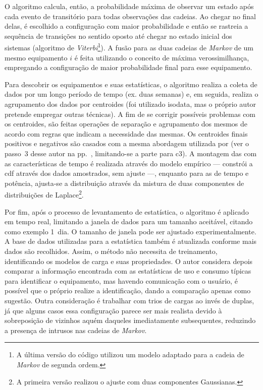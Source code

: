\begin{enumerate}[label=\textbf{1.\arabic*},wide=\parindent]
O algoritmo calcula, então, a probabilidade máxima de observar um
estado após cada evento de transitório para todas observações das
cadeias. Ao chegar no final delas, é escolhido a configuração com
maior probabilidade e então se rastreia a sequência de transições no
sentido oposto até chegar no estado inicial dos sistemas (algoritmo de
\emph{Viterbi}\footnote{A última versão do código utilizou um modelo
adaptado para a cadeia de \emph{Markov} de segunda ordem.}). A fusão
para as duas cadeias de \emph{Markov} de um mesmo equipamento $i$ é feita
utilizando o conceito de máxima verossimilhança, empregando a
configuração de maior probabilidade final para esse equipamento.

Para descobrir os equipamentos e suas estatísticas, o algoritmo realiza a
coleta de dados por um longo período de tempo (ex. duas semanas) e,
em seguida, realiza o agrupamento dos dados por centroides (foi
utilizado \acs{isodata}, mas o próprio autor pretende empregar
outras técnicas). A fim de se corrigir possíveis problemas com os centroides,
são feitas operações de separação e agrupamento dos mesmos de acordo
com regras que indicam a necessidade das mesmas. Os centroides finais
positivos e negativos são casados com a mesma abordagem utilizada por
\citeauthor*{nilm_hart_1992_8} (ver o passo~3 desse autor na
pp.~\pageref{text:passo3}, limitando-se a parte para \gls{c3}). A
montagem das  com as características de tempo é
realizada através do modelo empírico --- constrói a \acs{cdf}
através dos dados amostrados, sem ajuste ---, enquanto para as
 de tempo e potência, ajusta-se a distribuição
através da mistura de duas componentes de distribuições de
Laplace\footnote{A primeira versão realizou o ajuste com duas
componentes Gaussianas.}.

Por fim, após o processo de levantamento de estatística, o
algoritmo é aplicado em tempo real, limitando a janela de dados para um
tamanho aceitável, citando como exemplo 1~dia. O tamanho de janela
pode ser ajustado experimentalmente. A base de dados utilizadas para a
estatística também é atualizada conforme mais dados são recolhidos.
Assim, o método não necessita de treinamento, identificando os modelos
de carga e suas propriedades. O autor considera depois comparar a
informação encontrada com as estatísticas de uso e consumo típicas
para identificar o equipamento, mas havendo comunicação com o usuário, é
possível que o próprio realize a identificação, dando a comparação
apenas como sugestão. Outra consideração é trabalhar com trios de
cargas ao invés de duplas, já que alguns casos essa configuração
parece ser mais realista devido à sobreposição de vizinhos aquém
daqueles imediatamente subsequentes, reduzindo a presença de intrusos
nas cadeias de \emph{Markov}.


\end{enumerate}
